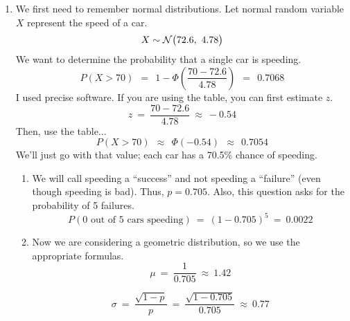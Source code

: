 \documentclass[12pt,letterpaper]{article}
\begin{document}
\begin{enumerate}
\item We first need to remember normal distributions. Let normal random variable $X$ represent the speed of a car.
$$X\sim \mathcal{N}\big(72.6,~4.78\big) $$
We want to determine the probability that a single car is speeding.
$$P(X > 70) ~~=~~ 1- \Phi\left(\frac{70-72.6}{4.78}\right) ~~=~~ 0.7068 $$
I used precise software. If you are using the table, you can first estimate $z$.
$$z ~=~ \frac{70-72.6}{4.78} ~\approx~ -0.54 $$
Then, use the table...
$$P(X > 70) ~~\approx~~ \Phi(-0.54) ~~\approx~~ 0.7054  $$
We'll just go with that value; each car has a 70.5\% chance of speeding.
\begin{enumerate}
\item We will call speeding a ``success'' and not speeding a ``failure'' (even though speeding is bad). Thus, $p=0.705$. Also, this question asks for the probability of 5 failures.
$$P(\text{0 out of 5 cars speeding}) ~=~ (1-0.705)^5 ~=~ 0.0022  $$
\item Now we are considering a geometric distribution, so we use the appropriate formulas.
$$\mu ~=~ \frac{1}{0.705} ~\approx~ 1.42$$

$$\sigma ~=~ \frac{\sqrt{1-p}}{p} ~=~ \frac{\sqrt{1-0.705}}{0.705}~\approx~ 0.77$$
\end{enumerate}




\end{enumerate}
\end{document}
